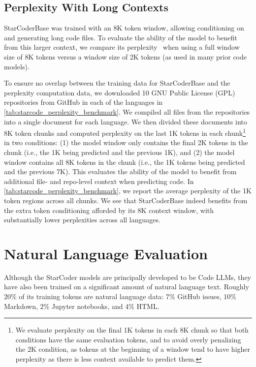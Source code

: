 \subsection{Perplexity With Long Contexts}

StarCoderBase was trained with an 8K token window, allowing conditioning on and generating long code files. To evaluate the ability of the model to benefit from this larger context, we compare its perplexity~\citep{bahl1983perplexity} when using a full window size of 8K tokens versus a window size of 2K tokens (as used in many prior code models).

To ensure no overlap between the training data for StarCoderBase and the perplexity computation data, we downloaded 10 GNU Public License (GPL) repositories from GitHub in each of the languages in \autoref{tab:starcode_perplexity_benchmark}. We compiled all files from the repositories into a single document for each language. We then divided these documents into 8K token chunks and computed perplexity on the last 1K tokens in each chunk\footnote{We evaluate perplexity on the final 1K tokens in each 8K chunk so that both conditions have the same evaluation tokens, and to avoid overly penalizing the 2K condition, as tokens at the beginning of a window tend to have higher perplexity as there is less context available to predict them.} in two conditions: (1) the model window only contains the final 2K tokens in the chunk (i.e., the 1K being predicted and the previous 1K), and (2) the model window contains all 8K tokens in the chunk (i.e., the 1K tokens being predicted and the previous 7K). This evaluates the ability of the model to benefit from additional file- and repo-level context when predicting code. In \autoref{tab:starcode_perplexity_benchmark}, we report the average perplexity of the 1K token regions across all chunks. We see that StarCoderBase indeed benefits from the extra token conditioning afforded by its 8K context window, with substantially lower perplexities across all languages.

\section{Natural Language Evaluation}

Although the StarCoder models are principally developed to be Code LLMs, they have also been trained on a significant amount of natural language text. Roughly 20\% of its training tokens are natural language data: 7\% GitHub issues, 10\% Markdown, 2\%  Jupyter notebooks, and 4\% HTML. 

